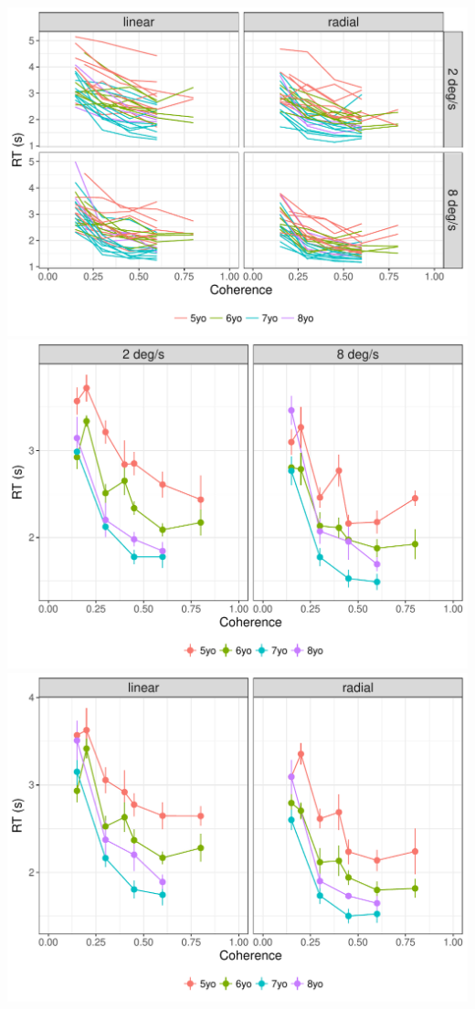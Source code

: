 \documentclass[landscape,final,paperwidth=60in,paperheight=40in,fontscale=0.285]{baposter}
\begin{document}
\begin{poster}
    {
 \begin{center}
 \includegraphics[scale=0.52,valign=t]{img/rt-pattern-speed-plot-1.pdf}
 \includegraphics[scale=0.52,valign=t]{img/rt-by-speed-and-age-plot-1.pdf}
 \includegraphics[scale=0.52,valign=t]{img/rt-by-pattern-and-age-plot-1.pdf}
 \end{center}
}


\end{poster}
\end{document}
